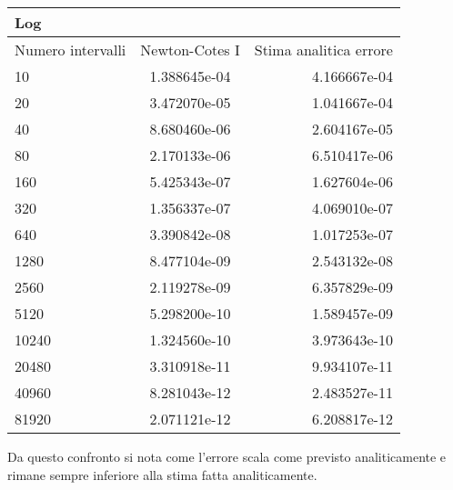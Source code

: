\begin{center}
\begin{longtable}[h]{lcr}
\toprule
Log &  & \\
\midrule
Numero intervalli & Newton-Cotes I & Stima analitica errore  \\
\midrule
10 &	  1.388645e-04  	 & 4.166667e-04 \\ 
20 &	 3.472070e-05  		 & 1.041667e-04 \\ 
40 &	 8.680460e-06  		 & 2.604167e-05 \\ 
80 &	 2.170133e-06  		 & 6.510417e-06 \\ 
160 &	 5.425343e-07  		 & 1.627604e-06 \\ 
320 &	 1.356337e-07  		 & 4.069010e-07 \\ 
640 &	  3.390842e-08  	 & 1.017253e-07 \\ 
1280 &	  8.477104e-09  	 & 2.543132e-08 \\ 
2560 &	  2.119278e-09  	 & 6.357829e-09 \\ 
5120 &	  5.298200e-10  	 & 1.589457e-09 \\ 
10240 &	  1.324560e-10  	 & 3.973643e-10 \\ 
20480 &	  3.310918e-11  	 & 9.934107e-11 \\ 
40960 &	  8.281043e-12  	 & 2.483527e-11 \\ 
81920 &	  2.071121e-12  	 & 6.208817e-12 \\ 
\end{longtable}
\end{center}
Da questo confronto si nota come l'errore scala come previsto analiticamente e rimane sempre inferiore alla stima fatta analiticamente.

